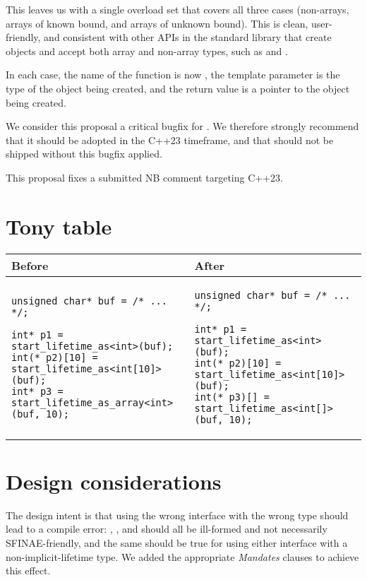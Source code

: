 This leaves us with a single overload set that covers all three cases (non-arrays, arrays of known bound, and arrays of unknown bound). This is clean, user-friendly, and consistent with other APIs in the standard library that create objects and accept both array and non-array types, such as  and .

In each case, the name of the function is now , the template parameter is the type of the object being created, and the return value is a pointer to the object being created.

We consider this proposal a critical bugfix for . We therefore strongly recommend that it should be adopted in the C++23 timeframe, and that  should not be shipped without this bugfix applied.

This proposal fixes a submitted NB comment targeting C++23.

\section{Tony table}

\begin{tabular}{|l|l|}
\hline
\textbf{Before}  &  \textbf{After} \\
\hline
\footnotesize
\begin{lstlisting}[basicstyle=\footnotesize \ttfamily]
unsigned char* buf = /* ... */;

int* p1 = start_lifetime_as<int>(buf);
int(* p2)[10] = start_lifetime_as<int[10]>(buf);
int* p3 = start_lifetime_as_array<int>(buf, 10);
\end{lstlisting}&
\begin{lstlisting}[basicstyle=\footnotesize \ttfamily]
unsigned char* buf = /* ... */;

int* p1 = start_lifetime_as<int>(buf);
int(* p2)[10] = start_lifetime_as<int[10]>(buf);
int(* p3)[] = start_lifetime_as<int[]>(buf, 10);
\end{lstlisting} \\
\hline
\end{tabular} 

\section{Design considerations}
\label{sec:design}

The design intent is that using the wrong interface with the wrong type should lead to a compile error: , , and  should all be ill-formed and not necessarily SFINAE-friendly, and the same should be true for using either interface with a non-implicit-lifetime type. We added the appropriate \emph{Mandates} clauses to achieve this effect.


